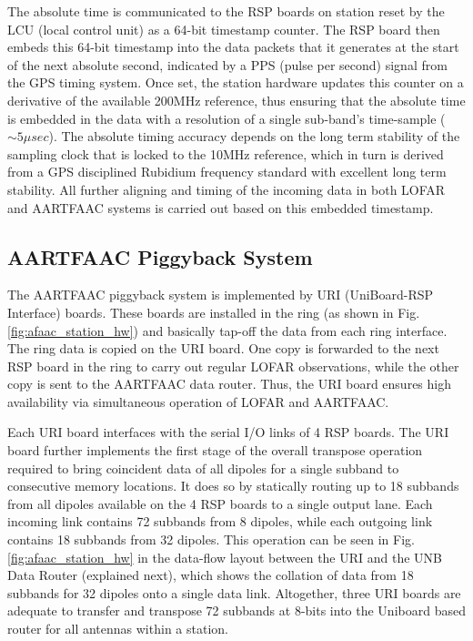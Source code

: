 \documentclass{ws-jai}
\begin{document}
The absolute time is communicated to the  RSP boards on station reset by the LCU
(local control  unit) as a 64-bit  timestamp counter. The RSP  board then embeds
this 64-bit timestamp  into the data packets  that it generates at  the start of
the next absolute second, indicated by a  PPS (pulse per second) signal from the
GPS timing  system.  Once set,  the station hardware  updates this counter  on a
derivative of  the available 200MHz  reference, thus ensuring that  the absolute
time  is  embedded  in  the  data  with a  resolution  of  a  single  sub-band's
time-sample ($\sim5\mu sec$).  The absolute  timing accuracy depends on the long
term stability  of the  sampling clock  that is locked  to the  10MHz reference,
which in turn is derived from a GPS disciplined Rubidium frequency standard with
excellent long term stability.  All further  aligning and timing of the incoming
data in both  LOFAR and AARTFAAC systems  is carried out based  on this embedded
timestamp.

\subsection {AARTFAAC Piggyback System}
The AARTFAAC  piggyback system  is implemented  by URI  (UniBoard-RSP Interface)
boards.   These   boards   are   installed    in   the   ring   (as   shown   in
Fig. \ref{fig:afaac_station_hw}) and  basically tap-off the data  from each ring
interface. The ring  data is copied on  the URI board. One copy  is forwarded to
the next RSP  board in the ring  to carry out regular  LOFAR observations, while
the other copy is sent to the  AARTFAAC data router. Thus, the URI board ensures
high availability via simultaneous operation of LOFAR and AARTFAAC.

Each URI board  interfaces with the serial  I/O links of 4 RSP  boards.  The URI
board  further implements  the first  stage of  the overall  transpose operation
required  to bring  coincident  data of  all  dipoles for  a  single subband  to
consecutive  memory locations.   It  does  so by  statically  routing  up to  18
subbands from all dipoles available on the 4 RSP boards to a single output lane.
Each incoming link contains 72 subbands from 8 dipoles, while each outgoing link
contains  18  subbands  from  32  dipoles.    This  operation  can  be  seen  in
Fig. \ref{fig:afaac_station_hw} in the data-flow  layout between the URI and the
UNB Data  Router (explained  next), which  shows the collation  of data  from 18
subbands for 32  dipoles onto a single data link.   Altogether, three URI boards
are adequate to  transfer and transpose 72 subbands at  8-bits into the Uniboard
based router for all antennas within a station.\\
\end{document}
